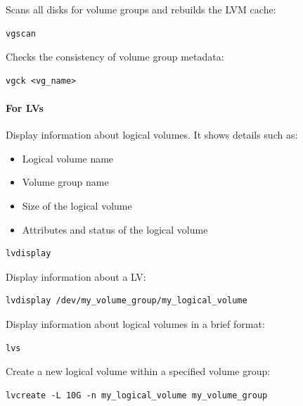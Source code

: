 \documentclass{article}
\newenvironment{codetemplate}[1][]{%
  \mybasecolorbox[#1]
  \itshape
}{%
  \endmybasecolorbox
}
\begin{document}
Scans all disks for volume groups and rebuilds the LVM cache:
\begin{codetemplate}
\begin{verbatim}
vgscan
\end{verbatim}
\end{codetemplate}

Checks the consistency of volume group metadata:
\begin{codetemplate}
\begin{verbatim}
vgck <vg_name>
\end{verbatim}
\end{codetemplate}

\paragraph{For LVs}

Display information about logical volumes. It shows details such as:
\begin{itemize}
    \item Logical volume name
    \item Volume group name
    \item Size of the logical volume
    \item Attributes and status of the logical volume
\end{itemize}
\begin{codetemplate}
\begin{verbatim}
lvdisplay
\end{verbatim}
\end{codetemplate}

Display information about a LV:
\begin{codetemplate}
\begin{verbatim}
lvdisplay /dev/my_volume_group/my_logical_volume
\end{verbatim}
\end{codetemplate}

Display information about logical volumes in a brief format:
\begin{codetemplate}
\begin{verbatim}
lvs
\end{verbatim}
\end{codetemplate}

Create a new logical volume within a specified volume group:
\begin{codetemplate}
\begin{verbatim}
lvcreate -L 10G -n my_logical_volume my_volume_group
\end{verbatim}
\end{codetemplate}
\end{document}

